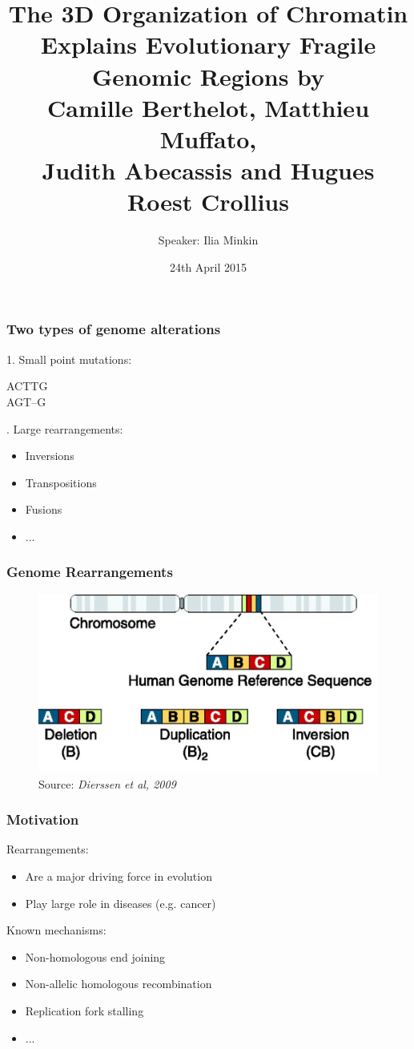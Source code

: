 \documentclass[svgnames,14pt]{beamer}
\title{The 3D Organization of Chromatin Explains Evolutionary Fragile Genomic Regions by \\ \vspace{12pt} \normalsize{Camille Berthelot, Matthieu Muffato, \\ Judith Abecassis and Hugues Roest Crollius} }
\author{Speaker: Ilia Minkin}
\institute{}
\begin{document}
\date{24th April 2015}
\maketitle

\begin{frame}
\frametitle{Two types of genome alterations}

1. Small point mutations:

{\vspace{12pt} \Large \color{Blue}
ACTTG\\
A{\color{Red}G}T--\hspace{2.7pt}G
\vspace{12pt}}

. Large rearrangements:
\begin{itemize}
\item Inversions
\item Transpositions
\item Fusions
\item ...
\end{itemize}
\end{frame}

\begin{frame}
\frametitle{Genome Rearrangements}
\begin{figure}
	\centering
	\includegraphics[scale = 0.30]{BasicRearr.jpg}
\caption{Source: \textit{Dierssen et al, 2009}}
\end{figure}
\end{frame}

\begin{frame}
\frametitle{Motivation}
Rearrangements:
\begin{itemize}
\item Are a major driving force in evolution
\item Play large role in diseases (e.g. cancer)
\end{itemize}
Known mechanisms:
\begin{itemize}
\item Non-homologous end joining
\item Non-allelic homologous recombination
\item Replication fork stalling
\item ...
\end{itemize}
\end{frame}
\end{document}
